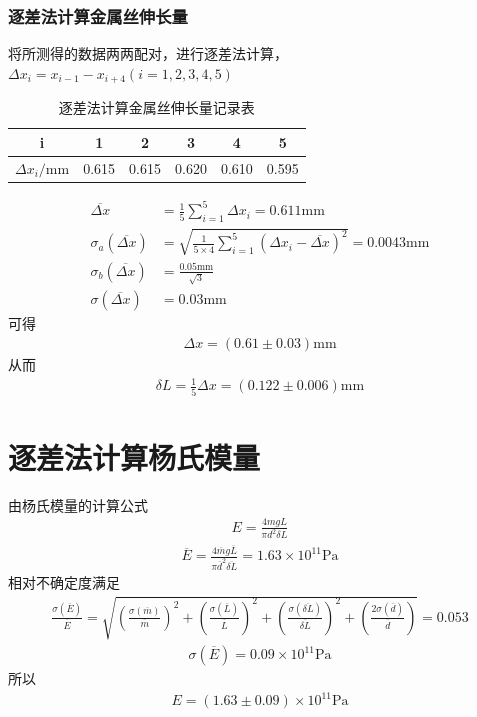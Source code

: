 \documentclass[a4paper]{ctexart}
\begin{document}
	\subsubsection{逐差法计算金属丝伸长量}
	将所测得的数据两两配对，进行逐差法计算，$\Delta x_i=x_{i-1}-x_{i+4}(i=1,2,3,4,5)$
	\begin{table}[H]
		\begin{center}
			\caption{逐差法计算金属丝伸长量记录表}
			\begin{tabular}{c|ccccc}
				i&1&2&3&4&5\\\hline
				$\Delta x_i/\mathrm{mm}$&0.615&0.615&0.620&0.610&0.595
			\end{tabular}
		\end{center}
	\end{table}
	\begin{align}
		\overline{\Delta x}&=\frac{1}{5}\sum_{i=1}^{5}\Delta x_i=0.611\mathrm{mm}\\
		\sigma_a(\overline{\Delta x})&=\sqrt{\frac{1}{5\times4}\sum_{i=1}^{5}(\Delta x_i-\overline{\Delta x})^2}=0.0043\mathrm{mm}\\
		\sigma_b(\overline{\Delta x})&=\frac{0.05\mathrm{mm}}{\sqrt{3}}\\
		\sigma(\overline{\Delta x})&=0.03\mathrm{mm}
	\end{align}
	可得
	\begin{align}
		\Delta x=(0.61\pm 0.03)\mathrm{mm}
	\end{align}
	从而
	\begin{align}
		\delta L=\frac{1}{5}\Delta x=(0.122\pm 0.006)\mathrm{mm}
	\end{align}
	\section{逐差法计算杨氏模量}
	由杨氏模量的计算公式
	\begin{align}
		E=\frac{4mgL}{\pi d^2\delta L}
	\end{align}
	\begin{align}
		\overline{E}=\frac{4\overline{m}g\overline{L}}{\pi \overline{d}^2\overline{\delta L}}=1.63\times10^{11}\mathrm{Pa}
	\end{align}
	相对不确定度满足
	\begin{align}
		\frac{\sigma(\overline{E})}{\overline{E}}=\sqrt{\left(\frac{\sigma(\overline{m})}{\overline{m}}\right)^2+\left(\frac{\sigma(\overline{L})}{\overline{L}}\right)^2+\left(\frac{\sigma(\overline{\delta L})}{\overline{\delta L}}\right)^2+\left(\frac{2\sigma(\overline{d})}{\overline{d}}\right)}=0.053
	\end{align}
	\begin{align}
		\sigma(\overline{E})=0.09\times10^{11}\mathrm{Pa}
	\end{align}
	所以
	\begin{align}
		E=(1.63\pm 0.09)\times10^{11}\mathrm{Pa}
	\end{align}
\end{document}
